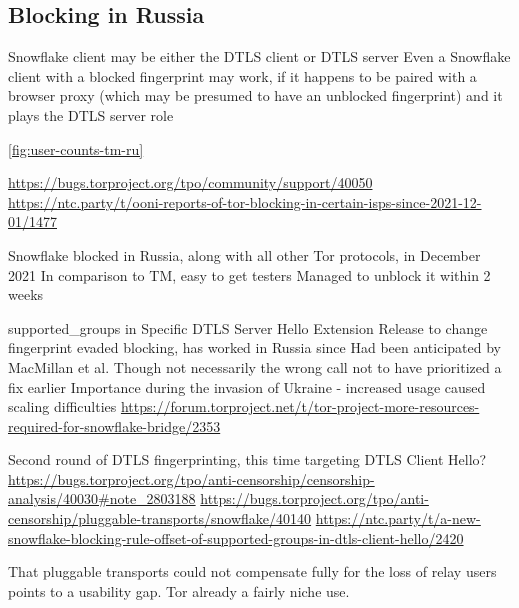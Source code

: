 \documentclass[letterpaper,twocolumn]{article}
\begin{document}

\subsection{Blocking in Russia}
\label{sec:block-ru}



Snowflake client may be either the DTLS client or DTLS server
Even a Snowflake client with a blocked fingerprint may work,
if it happens to be paired with a browser proxy (which may be presumed to have an unblocked fingerprint)
and it plays the DTLS server role


\autoref{fig:user-counts-tm-ru}

\url{https://bugs.torproject.org/tpo/community/support/40050}
\url{https://ntc.party/t/ooni-reports-of-tor-blocking-in-certain-isps-since-2021-12-01/1477}

Snowflake blocked in Russia, along with all other Tor protocols,
in December 2021 \cite{ooni-2021-russia-blocks-tor}
In comparison to TM, easy to get testers
Managed to unblock it within 2 weeks

supported\_groups in Specific DTLS Server Hello Extension
Release to change fingerprint evaded blocking, has worked in Russia since
Had been anticipated by MacMillan et al.\cite[\S 3]{arxiv.2008.03254}
Though not necessarily the wrong call not to have prioritized a fix earlier
Importance during the invasion of Ukraine
- increased usage caused scaling difficulties
  \url{https://forum.torproject.net/t/tor-project-more-resources-required-for-snowflake-bridge/2353}

Second round of DTLS fingerprinting, this time targeting DTLS Client Hello?
\url{https://bugs.torproject.org/tpo/anti-censorship/censorship-analysis/40030#note_2803188}
\url{https://bugs.torproject.org/tpo/anti-censorship/pluggable-transports/snowflake/40140}
\url{https://ntc.party/t/a-new-snowflake-blocking-rule-offset-of-supported-groups-in-dtls-client-hello/2420}

That pluggable transports could not compensate fully
for the loss of relay users points to a usability gap.
Tor already a fairly niche use.
\end{document}

